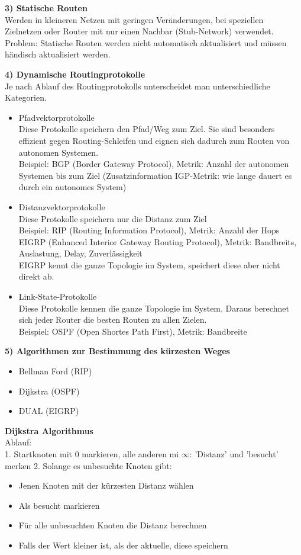 \textbf{3) Statische Routen} \\
Werden in kleineren Netzen mit geringen Veränderungen, bei speziellen Zielnetzen oder Router mit nur einen Nachbar (Stub-Network) verwendet. \\
Problem: Statische Routen werden nicht automatisch aktualisiert und müssen händisch aktualisiert werden.

\textbf{4) Dynamische Routingprotokolle} \\
Je nach Ablauf des Routingprotokolls unterscheidet man unterschiedliche Kategorien.
\begin{itemize}
	\item Pfadvektorprotokolle \\
	Diese Protokolle speichern den Pfad/Weg zum Ziel. Sie sind besonders effizient gegen Routing-Schleifen und eignen sich dadurch zum Routen von autonomen Systemen. \\
	Beispiel: BGP (Border Gateway Protocol), Metrik: Anzahl der autonomen Systemen bis zum Ziel (Zusatzinformation IGP-Metrik: wie lange dauert es durch ein autonomes System)
	\item Distanzvektorprotokolle \\
	Diese Protokolle speichern nur die Distanz zum Ziel \\
	Beispiel: RIP (Routing Information Protocol), Metrik: Anzahl der Hops \\
	EIGRP (Enhanced Interior Gateway Routing Protocol), Metrik: Bandbreits, Auslastung, Delay, Zuverlässigkeit \\
	EIGRP kennt die ganze Topologie im System, speichert diese aber nicht direkt ab.
	\item Link-State-Protokolle \\
	Diese Protokolle kennen die ganze Topologie im System. Daraus berechnet sich jeder Router die besten Routen zu allen Zielen. \\
	Beispiel: OSPF (Open Shortes Path First), Metrik: Bandbreite
\end{itemize}

\textbf{5) Algorithmen zur Bestimmung des kürzesten Weges} \\
\begin{itemize}
	\item Bellman Ford (RIP)
	\item Dijkstra (OSPF)
	\item DUAL (EIGRP)
\end{itemize}

\textbf{Dijkstra Algorithmus} \\
Ablauf: \\
1. Startknoten mit 0 markieren, alle anderen mi $\infty$: 'Distanz' und 'besucht' merken
2. Solange es unbesuchte Knoten gibt:
\begin{itemize}
	\item Jenen Knoten mit der kürzesten Distanz wählen
	\item Als besucht markieren
	\item Für alle unbesuchten Knoten die Distanz berechnen
	\item Falls der Wert kleiner ist, als der aktuelle, diese speichern
\end{itemize} 